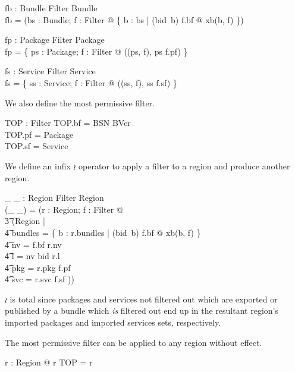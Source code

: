 \documentclass[a4paper,9pt]{article}
\begin{document}
\begin{axdef}
  fb : \power Bundle \cross Filter \fun \power Bundle \\
\where
  fb = (\lambda bs : \power Bundle; f : Filter @ \{ b : bs | (bid~b) \in f.bf @ xb(b, f) \}) \\
\end{axdef}

\begin{axdef}
  fp : \power Package \cross Filter \fun \power Package \\
\where
  fp = \{ ps : \power Package; f : Filter @ ((ps, f), ps \cap f.pf) \}
\end{axdef}

\begin{axdef}
  fs : \power Service \cross Filter \fun \power Service \\
\where
  fs = \{ ss : \power Service; f : Filter @ ((ss, f), ss \cap f.sf) \}
\end{axdef}

We also define the most permissive filter.
\begin{axdef}
  TOP : Filter
\where
  TOP.bf = BSN \cross BVer \\
  TOP.pf = Package \\
  TOP.sf = Service \\
\end{axdef}

We define an infix $\wr$ operator to apply a filter to a region and produce another region.
\begin{axdef}
  \_ \wr \_ : Region \cross Filter \fun Region \\
\where
  (\_ \wr \_) = (\lambda r : Region;  f : Filter @ \\
\t3   (\mu Region | \\
\t4 bundles = \{ b : r.bundles | (bid~b) \in f.bf @ xb(b, f) \} \land \\
\t4 nv = f.bf \dres r.nv \land \\
\t4 l = nv \circ bid \circ r.l \land \\
\t4 pkg = r.pkg \cap f.pf \land \\
\t4 svc = r.svc \cap f.sf )) \\
\end{axdef}
$\wr$ is total since packages and services not filtered out which are exported or published by a
bundle which \textit{is} filtered out end up
in the resultant region's imported packages and imported services sets, respectively.

The most permissive filter can be applied to any region without effect.
\begin{argue}
  \shows \forall r : Region @ r \wr TOP = r \\
\end{argue}
\end{document}
